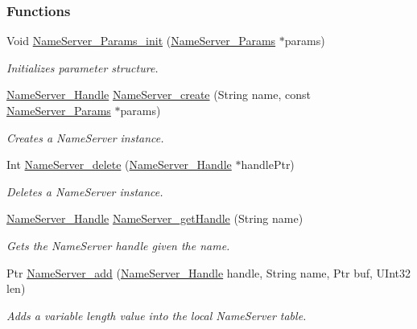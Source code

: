 \subsubsection*{Functions}
\begin{DoxyCompactItemize}
\item 
Void \hyperlink{_name_server_8h_a9bb546e8a7d656ce5e919650febe4989}{Name\-Server\-\_\-\-Params\-\_\-init} (\hyperlink{struct_name_server___params}{Name\-Server\-\_\-\-Params} $\ast$params)
\begin{DoxyCompactList}\small\item\em Initializes parameter structure. \end{DoxyCompactList}\item 
\hyperlink{_name_server_8h_a99fa93c4ee4169db90162b523d9152d4}{Name\-Server\-\_\-\-Handle} \hyperlink{_name_server_8h_a7345e78debfbf6d5da6ae1603764429a}{Name\-Server\-\_\-create} (String name, const \hyperlink{struct_name_server___params}{Name\-Server\-\_\-\-Params} $\ast$params)
\begin{DoxyCompactList}\small\item\em Creates a Name\-Server instance. \end{DoxyCompactList}\item 
Int \hyperlink{_name_server_8h_a3419fc2bf3e6c34289c620cf9be38a04}{Name\-Server\-\_\-delete} (\hyperlink{_name_server_8h_a99fa93c4ee4169db90162b523d9152d4}{Name\-Server\-\_\-\-Handle} $\ast$handle\-Ptr)
\begin{DoxyCompactList}\small\item\em Deletes a Name\-Server instance. \end{DoxyCompactList}\item 
\hyperlink{_name_server_8h_a99fa93c4ee4169db90162b523d9152d4}{Name\-Server\-\_\-\-Handle} \hyperlink{_name_server_8h_abaebe428fbf536448c99acb6faf25134}{Name\-Server\-\_\-get\-Handle} (String name)
\begin{DoxyCompactList}\small\item\em Gets the Name\-Server handle given the name. \end{DoxyCompactList}\item 
Ptr \hyperlink{_name_server_8h_ad7d45ed8fe5bcd1f10da5914c8da39f5}{Name\-Server\-\_\-add} (\hyperlink{_name_server_8h_a99fa93c4ee4169db90162b523d9152d4}{Name\-Server\-\_\-\-Handle} handle, String name, Ptr buf, U\-Int32 len)
\begin{DoxyCompactList}\small\item\em Adds a variable length value into the local Name\-Server table. \end{DoxyCompactList}\item 

\end{DoxyCompactItemize}
